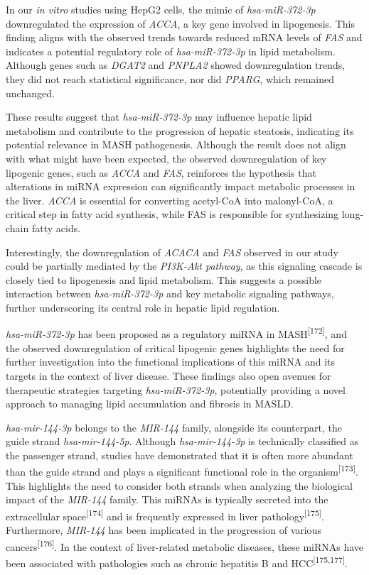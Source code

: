\documentclass[
  11pt,
  letterpaper,
]{book}
\begin{document}
In our \emph{in vitro} studies using HepG2 cells, the mimic of
\emph{hsa-miR-372-3p} downregulated the expression of \emph{ACCA}, a key
gene involved in lipogenesis. This finding aligns with the observed
trends towards reduced mRNA levels of \emph{FAS} and indicates a
potential regulatory role of \emph{hsa-miR-372-3p} in lipid metabolism.
Although genes such as \emph{DGAT2} and \emph{PNPLA2} showed
downregulation trends, they did not reach statistical significance, nor
did \emph{PPARG}, which remained unchanged.

These results suggest that \emph{hsa-miR-372-3p} may influence hepatic
lipid metabolism and contribute to the progression of hepatic steatosis,
indicating its potential relevance in MASH pathogenesis. Although the
result does not align with what might have been expected, the observed
downregulation of key lipogenic genes, such as \emph{ACCA} and
\emph{FAS}, reinforces the hypothesis that alterations in miRNA
expression can significantly impact metabolic processes in the liver.
\emph{ACCA} is essential for converting acetyl-CoA into malonyl-CoA, a
critical step in fatty acid synthesis, while FAS is responsible for
synthesizing long-chain fatty acids.

Interestingly, the downregulation of \emph{ACACA} and \emph{FAS}
observed in our study could be partially mediated by the \emph{PI3K-Akt
pathway}, as this signaling cascade is closely tied to lipogenesis and
lipid metabolism. This suggests a possible interaction between
\emph{hsa-miR-372-3p} and key metabolic signaling pathways, further
underscoring its central role in hepatic lipid regulation.

\emph{hsa-miR-372-3p} has been proposed as a regulatory miRNA in
MASH\textsuperscript{{[}172{]}}, and the observed downregulation of
critical lipogenic genes highlights the need for further investigation
into the functional implications of this miRNA and its targets in the
context of liver disease. These findings also open avenues for
therapeutic strategies targeting \emph{hsa-miR-372-3p}, potentially
providing a novel approach to managing lipid accumulation and fibrosis
in MASLD.

\emph{hsa-mir-144-3p} belongs to the \emph{MIR-144} family, alongside
its counterpart, the guide strand \emph{hsa-mir-144-5p}. Although
\emph{hsa-mir-144-3p} is technically classified as the passenger strand,
studies have demonstrated that it is often more abundant than the guide
strand and plays a significant functional role in the
organism\textsuperscript{{[}173{]}}. This highlights the need to
consider both strands when analyzing the biological impact of the
\emph{MIR-144} family. This miRNAs is typically secreted into the
extracellular space\textsuperscript{{[}174{]}} and is frequently
expressed in liver pathology\textsuperscript{{[}175{]}}. Furthermore,
\emph{MIR-144} has been implicated in the progression of various
cancers\textsuperscript{{[}176{]}}. In the context of liver-related
metabolic diseases, these miRNAs have been associated with pathologies
such as chronic hepatitis B and HCC\textsuperscript{{[}175,177{]}}.
\end{document}
